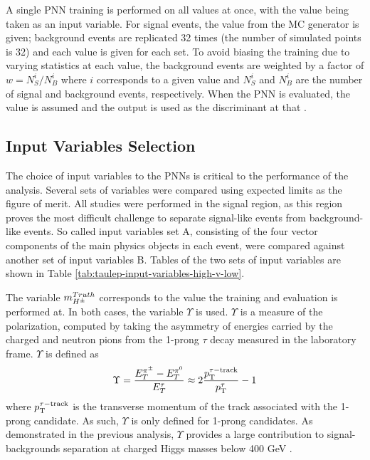 			A single \gls{PNN} training is performed on all \mHpm values at once, with the \mHpm value being taken as an input variable. For signal events, the \mHpm value from the \gls{MC} generator is given; background events are replicated 32 times (the number of simulated \mHpm points is 32) and each \mHpm value is given for each set. To avoid biasing the training due to varying statistics at each \mHpm value, the background events are weighted by a factor of $w = N^{i}_{S}/N^{i}_{B}$ where $i$ corresponds to a given \mHpm value and $N^{i}_{S}$ and $N^{i}_{B}$ are the number of signal and background events, respectively. When the \gls{PNN} is evaluated, the \mHpm value is assumed and the output is used as the discriminant at that \mHpm.

		\subsection{Input Variables Selection}\label{ssec:input-variables}
			The choice of input variables to the \glspl{PNN} is critical to the performance of the analysis. Several sets of variables were compared using expected limits as the figure of merit. All studies were performed in the \taulep signal region, as this region proves the most difficult challenge to separate signal-like events from background-like events. So called input variables set A, consisting of the four vector components of the main physics objects in each event, were compared against another set of input variables B. Tables of the two sets of input variables are shown in Table \ref{tab:taulep-input-variables-high-v-low}. 

			The variable $m_{H^{\pm}}^{Truth}$ corresponds to the \mHpm value the training and evaluation is performed at. In both cases, the variable $\Upsilon$ is used. $\Upsilon$ is a measure of the \tauhad polarization, computed by taking the asymmetry of energies carried by the charged and neutron pions from the 1-prong $\tau$ decay measured in the laboratory frame. $\Upsilon$ is defined as
			\begin{equation}\label{eqn:upsilon}
			\Upsilon = \frac{ E^{\pi^{\pm}}_{T} - E^{\pi^{0}}_{T}}{E^{\tau}_{T}} \approx 2 \frac{p_{\text{T}}^{\tau-\mathrm{track}}}{p_{\text{T}}^{\tau}} -1
			\end{equation}
			where $p_{\text{T}}^{\tau-\mathrm{track}}$ is the transverse momentum of the track associated with the 1-prong \tauhad candidate. As such, $\Upsilon$ is only defined for 1-prong \tauhad candidates. As demonstrated in the previous analysis, $\Upsilon$ provides a large contribution to signal-backgrounds separation at charged Higgs masses below 400 GeV \cite{hpm-previous}.

